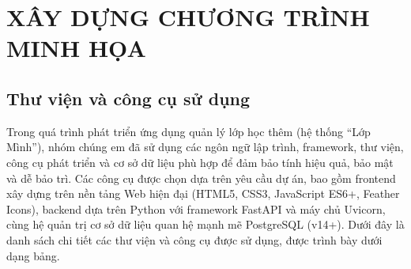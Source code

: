 \chapter{XÂY DỰNG CHƯƠNG TRÌNH MINH HỌA}

\section{Thư viện và công cụ sử dụng}

Trong quá trình phát triển ứng dụng quản lý lớp học thêm (hệ thống ``Lớp Mình''), nhóm chúng em đã sử dụng các ngôn ngữ lập trình, framework, thư viện, công cụ phát triển và cơ sở dữ liệu phù hợp để đảm bảo tính hiệu quả, bảo mật và dễ bảo trì. Các công cụ được chọn dựa trên yêu cầu dự án, bao gồm frontend xây dựng trên nền tảng Web hiện đại (HTML5, CSS3, JavaScript ES6+, Feather Icons), backend dựa trên Python với framework FastAPI và máy chủ Uvicorn, cùng hệ quản trị cơ sở dữ liệu quan hệ mạnh mẽ PostgreSQL (v14+). Dưới đây là danh sách chi tiết các thư viện và công cụ được sử dụng, được trình bày dưới dạng bảng.

